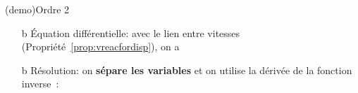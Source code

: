 \documentclass[../../main/main.tex]{subfiles}
\begin{document}
\begin{tcb*}(demo){Ordre 2}
	\begin{enumerate}[start=3]
		\item[b]{Équation différentielle}:
		      avec le lien entre vitesses (Propriété~\ref{prop:vreacfordisp}), on a
		      \psw{%
			      \[
				      v = \frac{1}{-\abs{\nu_{\ce{A}}}} \dv{[\ce{A}]}{t}
				      \quad \ste{\Longleftrightarrow}{v = k[\ce{A}]^2} \quad
				      \boxed{\dv{[\ce{A}]}{t} = -\abs{\nu_{\ce{A}}} k [\ce{A}]^2}
			      \]
		      }%
		\item[b]{Résolution}:
		      on \textbf{sépare les variables} et on utilise la dérivée de la
		      fonction inverse~:
	\end{enumerate}
\end{tcb*}
\end{document}
